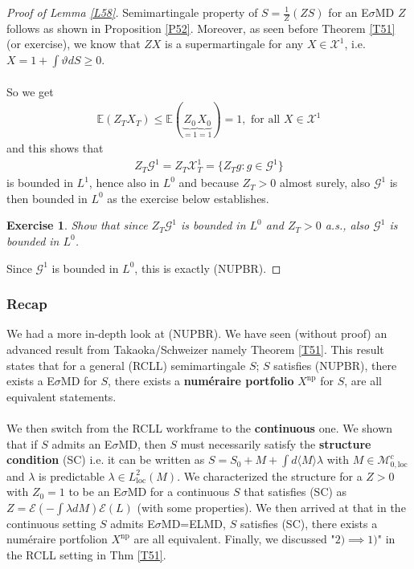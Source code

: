 \documentclass[12pt,a4paper, twoside]{article}
\newtheorem{exe}{Exercise}[section]
\theoremstyle{definition}
\newcommand{\EE}{\mathbb{E}} %
\begin{document}
\begin{proof}[Proof of Lemma \ref{L58}] Semimartingale property of $S=\frac{1}{Z}(ZS)$ for an E$\sigma$MD $Z$ follows as shown in Proposition \ref{P52}. Moreover, as seen before Theorem \ref{T51} (or exercise), we know that $ZX$ is a supermartingale for any $X \in \mathcal{X}^1$, i.e. $X= 1 + \int \vartheta dS \geq 0$. \\
\\
So we get 
\begin{align*}
\EE(Z_TX_T) \leq \EE(\underbrace{Z_0}_{=1}\underbrace{X_0}_{=1})=1, \text{ for all } X \in \mathcal{X}^1
\end{align*}
and this shows that 
\begin{align*}
Z_T\mathcal{G}^1 = Z_T\mathcal{X}_T^1 = \{ Z_T g : g \in \mathcal{G}^1 \}
\end{align*}
is bounded in $L^1$, hence also in $L^0$ and because $Z_T>0$ almost surely, also $\mathcal{G}^1$ is then bounded in $L^0$ as the exercise below establishes.
\begin{exe} Show that since $Z_T \mathcal{G}^1$ is bounded in $L^0$ and $Z_T>0$ a.s., also $\mathcal{G}^1$ is bounded in $L^0$. 
\end{exe}
\noindent Since $\mathcal{G}^1$ is bounded in $L^0$, this is exactly (NUPBR). 
\end{proof}
\subsubsection{Recap}
We had a more in-depth look at (NUPBR). We have seen (without proof) an advanced result from Takaoka/Schweizer namely Theorem \ref{T51}. This result states that for a general (RCLL) semimartingale $S$; $S$ satisfies (NUPBR), there exists a E$\sigma$MD for $S$, there exists a \textbf{numéraire portfolio} $X^\text{np}$ for $S$, are all equivalent statements. \\
\\
We then switch from the RCLL workframe to the \textbf{continuous} one. We shown that if $S$ admits an E$\sigma$MD, then $S$ must necessarily satisfy the \textbf{structure condition} (SC) i.e. it can be written as $S=S_0+M+ \int d \langle M \rangle \lambda$ with $M \in \mathcal{M}_{0, \text{loc}}^c$ and $\lambda$ is predictable $\lambda \in L_\text{loc}^2(M)$. We characterized the structure for a $Z>0$ with $Z_0=1$ to be an E$\sigma$MD for a continuous $S$ that satisfies (SC) as $Z= \mathcal{E}(- \int \lambda dM) \mathcal{E}(L)$ (with some properties). We then arrived at that in the continuous setting $S$ admits E$\sigma$MD=ELMD, $S$ satisfies (SC), there exists a numéraire portfolion $X^{\text{np}}$ are all equivalent. Finally, we discussed "$2) \implies 1)$" in the RCLL setting in Thm \ref{T51}.
\newpage
\end{document}
